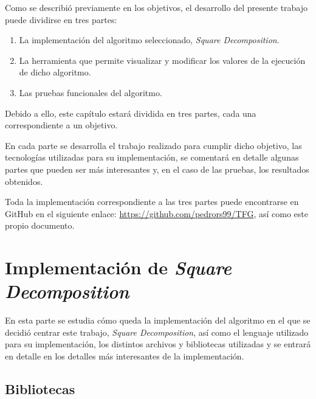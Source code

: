 Como se describió previamente en los objetivos, el desarrollo del presente trabajo puede dividirse en tres partes:
\begin{enumerate}
    \item La implementación del algoritmo seleccionado, \emph{Square Decomposition}.
    \item La herramienta que permite visualizar y modificar los valores de la ejecución de dicho algoritmo.
    \item Las pruebas funcionales del algoritmo.
\end{enumerate}

Debido a ello, este capítulo estará dividida en tres partes, cada una correspondiente a un objetivo.

En cada parte se desarrolla el trabajo realizado para cumplir dicho objetivo, las tecnologías utilizadas para su implementación, se comentará en detalle algunas partes que pueden ser más interesantes y, en el caso de las pruebas, los resultados obtenidos.

Toda la implementación correspondiente a las tres partes puede encontrarse en GitHub en el siguiente enlace: \href{https://github.com/pedrors99/TFG}{https://github.com/pedrors99/TFG}, así como este propio documento.

\section{Implementación de \emph{Square Decomposition}}

En esta parte se estudia cómo queda la implementación del algoritmo en el que se decidió centrar este trabajo, \emph{Square Decomposition}, así como el lenguaje utilizado para su implementación, los distintos archivos y bibliotecas utilizadas y se entrará en detalle en los detalles más interesantes de la implementación.

\subsection{Bibliotecas}

